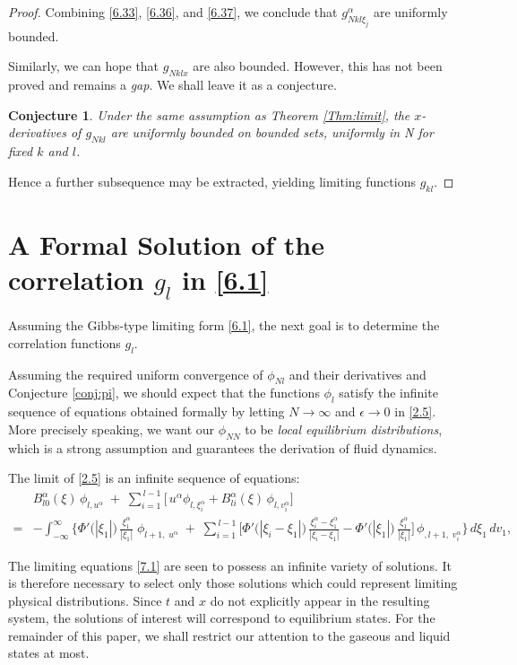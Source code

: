 \documentclass[11pt]{article}
\newtheorem{conjecture}{Conjecture}
\begin{document}
\begin{proof}
Combining \eqref{6.33}, \eqref{6.36}, and \eqref{6.37}, we conclude that $g_{Nkl\xi_j}^\alpha$ are uniformly bounded.

Similarly, we can hope that $g_{Nkl x}$ are also bounded. However, this has not been proved and remains a \emph{gap}. We shall leave it as a conjecture.
\begin{conjecture}\label{conj:deri}
    Under the same assumption as Theorem \ref{Thm:limit}, the $x$-derivatives of $g_{Nkl}$ are uniformly bounded on bounded sets, uniformly in N for fixed $k$ and $l$.
\end{conjecture}

Hence a further subsequence may be extracted, yielding limiting functions $g_{kl}$. 
\end{proof}



\section{A Formal Solution of the correlation $g_l$ in \eqref{6.1}}\label{Sectiongl}
Assuming the Gibbs-type limiting form \eqref{6.1}, the next goal is to determine the correlation functions $g_l$.

Assuming the required uniform convergence of $\phi_{Nl}$ and their derivatives and Conjecture \ref{conj:pi}, we should expect that the functions $\phi_l$
satisfy the infinite sequence of equations obtained formally
by letting $N \to \infty$ and $\epsilon \to 0$ in \eqref{2.5}. More precisely speaking, we want our $\phi_{NN}$ to be \emph{local equilibrium distributions}, which is a strong assumption and guarantees the derivation of fluid dynamics.\cite{DeMasiEtAl1984}

The limit of \eqref{2.5} is an infinite sequence of equations:
\begin{align*}\label{7.1}\tag{7.1}
    &B_{l0}^\alpha(\xi)\,\phi_{l,u^\alpha}
\;+\; \sum_{i=1}^{\,l-1}\big[\,u^\alpha \phi_{l,\xi_i^\alpha}+B_{li}^\alpha(\xi)\,\phi_{l,v_i^\alpha}\big]\\    =&
-
\int_{-\infty}^{\infty}
\bigg\{
\Phi'\big(|\xi_1|\big)\,\frac{\xi_1^\alpha}{|\xi_1|}
\;\phi_{l+1,\;u^\alpha}
\;+\;
\sum_{i=1}^{\,l-1}
\bigg[
\Phi'\big(|\xi_i-\xi_1|\big)\,\frac{\xi_i^\alpha-\xi_1^\alpha}{|\xi_i-\xi_1|}
-
\Phi'\big(|\xi_1|\big)\,\frac{\xi_1^\alpha}{|\xi_1|}
\bigg]\,
\phi_{,l+1,\;v_i^\alpha}
\bigg\}\,d\xi_1\,dv_1,
\end{align*}


\vspace{0.5em}
\noindent
The limiting equations \eqref{7.1} are seen to possess an infinite variety of solutions.  It is therefore necessary to select only those solutions which could represent limiting physical distributions. Since $t$ and $x$ do not explicitly appear in the resulting system, the solutions of interest will correspond to equilibrium states.
For the remainder of this paper, we shall restrict our attention
to the gaseous and liquid states at most.
\end{document}

